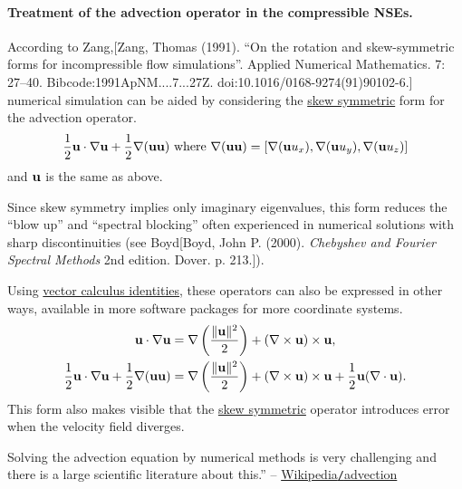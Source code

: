 \documentclass{article}
\begin{document}
\paragraph{Treatment of the advection operator in the compressible NSEs.} According to Zang,[Zang, Thomas (1991). ``On the rotation and skew-symmetric forms for incompressible flow simulations''. Applied Numerical Mathematics. 7: 27--40. Bibcode:1991ApNM....7...27Z. doi:10.1016/0168-9274(91)90102-6.] numerical simulation can be aided by considering the \href{https://en.wikipedia.org/wiki/Skew-symmetric_matrix}{skew symmetric} form for the advection operator.
\begin{align*}
	\frac{1}{2}{\bf u}\cdot\nabla{\bf u} + \frac{1}{2}\nabla({\bf u}{\bf u}) \mbox{ where } \nabla({\bf u}{\bf u}) = \left[\nabla({\bf u}u_x),\nabla({\bf u}u_y),\nabla({\bf u}u_z)\right]
\end{align*}
and ${\bf u}$ is the same as above.

%
Since skew symmetry implies only imaginary eigenvalues, this form reduces the ``blow up'' and ``spectral blocking'' often experienced in numerical solutions with sharp discontinuities (see Boyd[Boyd, John P. (2000). \textit{Chebyshev and Fourier Spectral Methods} 2nd edition. Dover. p. 213.]).

%
Using \href{https://en.wikipedia.org/wiki/Vector_calculus_identities#Vector_dot_product}{vector calculus identities}, these operators can also be expressed in other ways, available in more software packages for more coordinate systems.
\begin{align*}
	{\bf u}\cdot\nabla{\bf u} &= \nabla\left(\frac{\|{\bf u}\|^2}{2}\right) + (\nabla\times{\bf u})\times{\bf u},\\
	\frac{1}{2}{\bf u}\cdot\nabla{\bf u} + \frac{1}{2}\nabla({\bf u}{\bf u}) &= \nabla\left(\frac{\|{\bf u}\|^2}{2}\right) + (\nabla\times{\bf u})\times{\bf u} + \frac{1}{2}{\bf u}(\nabla\cdot{\bf u}).
\end{align*}
This form also makes visible that the \href{https://en.wikipedia.org/wiki/Skew-symmetric_matrix}{skew symmetric} operator introduces error when the velocity field diverges.

Solving the advection equation by numerical methods is very challenging and there is a large scientific literature about this.'' -- \href{https://en.wikipedia.org/wiki/Advection}{Wikipedia{\tt/}advection}

\end{document}
